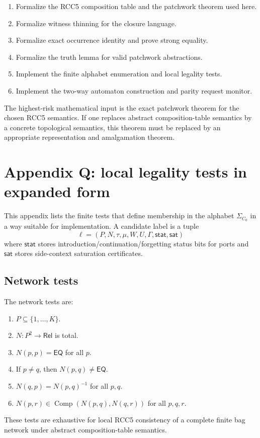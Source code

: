 \documentclass[11pt]{article}
\newcommand{\Rel}{\mathsf{Rel}}
\newcommand{\EQ}{\mathsf{EQ}}
\newcommand{\Comp}{\operatorname{Comp}}
\begin{document}
\begin{enumerate}[label=(V\arabic*)]
\item Formalize the RCC5 composition table and the patchwork theorem used here.
\item Formalize witness thinning for the closure language.
\item Formalize exact occurrence identity and prove strong equality.
\item Formalize the truth lemma for valid patchwork abstractions.
\item Implement the finite alphabet enumeration and local legality tests.
\item Implement the two-way automaton construction and parity request monitor.
\end{enumerate}

The highest-risk mathematical input is the exact patchwork theorem for the chosen RCC5 semantics.  If one replaces abstract composition-table semantics by a concrete topological semantics, this theorem must be replaced by an appropriate representation and amalgamation theorem.




\section{Appendix Q: local legality tests in expanded form}

This appendix lists the finite tests that define membership in the alphabet $\Sigma_{C_0}$ in a way suitable for implementation.  A candidate label is a tuple
\[
\ell=(P,N,\tau,\mu,W,U,\Gamma,\mathsf{stat},\mathsf{sat})
\]
where $\mathsf{stat}$ stores introduction/continuation/forgetting status bits for ports and $\mathsf{sat}$ stores side-context saturation certificates.

\subsection{Network tests}

The network tests are:
\begin{enumerate}[label=(N\arabic*)]
\item $P\subseteq\{1,\ldots,K\}$.
\item $N:P^2\to\Rel$ is total.
\item $N(p,p)=\EQ$ for all $p$.
\item If $p\ne q$, then $N(p,q)\ne\EQ$.
\item $N(q,p)=N(p,q)^{-1}$ for all $p,q$.
\item $N(p,r)\in\Comp(N(p,q),N(q,r))$ for all $p,q,r$.
\end{enumerate}
These tests are exhaustive for local RCC5 consistency of a complete finite bag network under abstract composition-table semantics.
\end{document}
